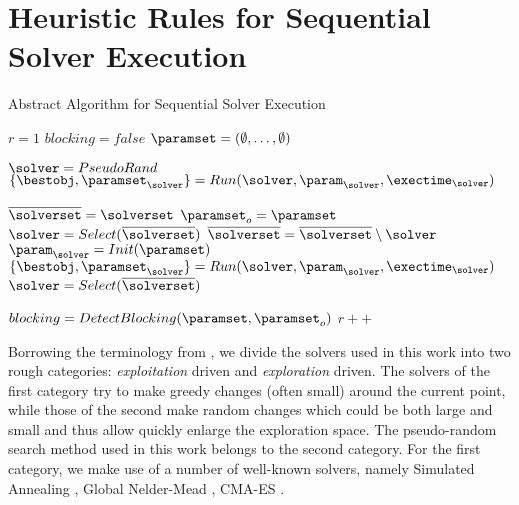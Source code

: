 \section{Heuristic Rules for Sequential Solver Execution}



\begin{algorithm}
\caption{Abstract Algorithm for Sequential Solver Execution \label{algoSolverCombination}}
\begin{algorithmic}
\State $r = 1$
\State $blocking = false$
\State $\paramset = ( \emptyset, \ldots, \emptyset)$ 
  	
 
	 \State $\solver = PseudoRand$
	 \State $\{ \bestobj, \paramset_{\solver} \} = Run(\solver, \param_{\solver}, \exectime_{\solver})$ 
    
    
    \Else

       \State $\overline{\solverset}= \solverset$ 
       \State $\paramset_o = \paramset$  
 		\State $\solver = Select(\overline{\solverset})$
 		\State $\overline{\solverset} = \overline{\solverset} \setminus \solver$
		\State
		\State $\param_{\solver} = Init(\paramset)$
  		\State $\{ \bestobj, \paramset_{\solver} \} = Run(\solver, \param_{\solver}, \exectime_{\solver})$ 
      		 \State $\solver = Select(\overline{\solverset})$
 	 \EndWhile
         \EndIf
         
	 \State
\State $blocking =  DetectBlocking(\paramset, \paramset_o)$
\State $r++$
\EndWhile
\end{algorithmic}
\end{algorithm}

Borrowing the terminology from \cite{}, we divide the solvers used in this work into two rough categories: {\em exploitation} driven and {\em exploration} driven. The solvers of the first category try to make greedy changes (often small) around the current point, while those of the second make random changes which could be both large and small and thus allow quickly enlarge the exploration space. The pseudo-random search method used in this work belongs to the second category. For the first category, we make use of a number of well-known solvers, namely Simulated Annealing \cite{}, Global Nelder-Mead \cite{}, CMA-ES \cite{}.


